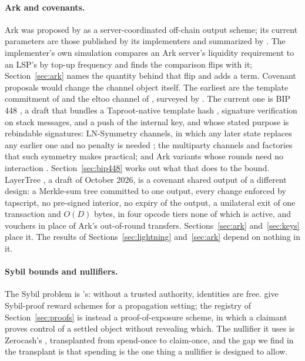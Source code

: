\documentclass[11pt]{article}
\theoremstyle{plain}
\theoremstyle{definition}
\theoremstyle{remark}
\begin{document}
\paragraph{Ark and covenants.} Ark was proposed by \citet{keceli2023ark} as a server-coordinated off-chain output scheme; its current parameters are those published by its implementers \citep{second2026vtxo,second2026forfeits,second2025liquidity} and summarized by \citet{optech-ark}. The implementer's own simulation \citep{second2025liquidity} compares an Ark server's liquidity requirement to an LSP's by top-up frequency and finds the comparison flips with it; Section~\ref{sec:ark} names the quantity behind that flip and adds a term. Covenant proposals would change the channel object itself. The earliest are the template commitment of \citet{rubin2020ctv} and the eltoo channel of \citet{decker2018eltoo}, surveyed by \citet{optech-ctv}. The current one is BIP 448 \citep{bip448}, a draft that bundles a Taproot-native template hash \citep{bip446}, signature verification on stack messages, and a push of the internal key, and whose stated purpose is rebindable signatures: LN-Symmetry channels, in which any later state replaces any earlier one and no penalty is needed \citep{optech-eltoo}; the multiparty channels and factories \citep{burchert2018factories} that such symmetry makes practical; and Ark variants whose rounds need no interaction \citep{roose2025erk}. Section~\ref{sec:bip448} works out what that does to the bound. LayerTree \citep{osuntokun2026layertree}, a draft of October 2026, is a covenant shared output of a different design: a Merkle-sum tree committed to one output, every change enforced by tapscript, no pre-signed interior, no expiry of the output, a unilateral exit of one transaction and $O(D)$ bytes, in four opcode tiers none of which is active, and vouchers in place of Ark's out-of-round transfers. Sections~\ref{sec:ark} and~\ref{sec:keys} place it. The results of Sections~\ref{sec:lightning} and~\ref{sec:ark} depend on nothing in it.

\paragraph{Sybil bounds and nullifiers.} The Sybil problem is \citet{douceur2002sybil}'s: without a trusted authority, identities are free. \citet{babaioff2012redballoons} give Sybil-proof reward schemes for a propagation setting; the registry of Section~\ref{sec:proofs} is instead a proof-of-exposure scheme, in which a claimant proves control of a settled object without revealing which. The nullifier it uses is Zerocash's \citep{bensasson2014zerocash,hopwood2016zcash}, transplanted from spend-once to claim-once, and the gap we find in the transplant is that spending is the one thing a nullifier is designed to allow.
\end{document}
